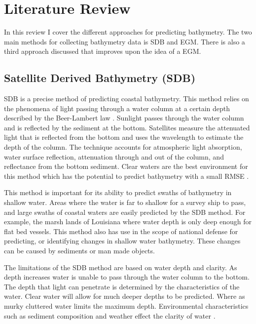 \section{Literature Review}
\setlength{\parindent}{10ex}
In this review I cover the different approaches for predicting bathymetry.
The two main methods for collecting bathymetry data is \ac{SDB} and \ac{EGM}.
There is also a third approach discussed that improves upon the idea of a \ac{EGM}.


\subsection{Satellite Derived Bathymetry (SDB)}
\ac{SDB} is a precise method of predicting coastal bathymetry. 
This method relies on the phenomena of light passing through a water column at a certain depth described by the Beer-Lambert law \cite{chybicki2018three}\cite{vinayaraj2016satellite}.
Sunlight passes through the water column and is reflected by the sediment at the bottom.
Satellites measure the attenuated light that is reflected from the bottom and uses the wavelength to estimate the depth of the column.
The technique accounts for atmospheric light absorption, water surface reflection, attenuation through and out of the column, and reflectance from the bottom sediment.
Clear waters are the best environment for this method which has the potential to predict bathymetry with a small RMSE \cite{chybicki2018three}.

\par
This method is important for its ability to predict swaths of bathymetry in shallow water.
Areas where the water is far to shallow for a survey ship to pass, and large swaths of coastal waters are easily predicted by the \ac{SDB} method.
For example, the marsh lands of Louisiana where water depth is only deep enough for flat bed vessels.
This method also has use in the scope of national defense for predicting, or identifying changes in shallow water bathymetry.
These changes can be caused by sediments or man made objects. 

\par
The limitations of the \ac{SDB} method are based on water depth and clarity.
As depth increases water is unable to pass through the water column to the bottom.
The depth that light can penetrate is determined by the characteristics of the water.
Clear water will allow for much deeper depths to be predicted.
Where as murky cluttered water limits the maximum depth.
Environmental characteristics such as sediment composition and weather effect the clarity of water \cite{vinayaraj2016satellite}.

